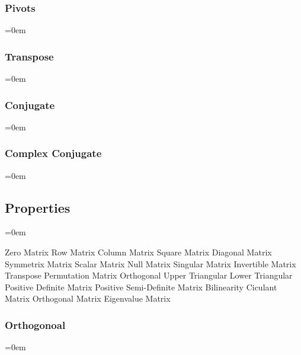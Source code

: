 \subsubsectionend
\subsubsection{Pivots}
\label{sssec:pivots}
\parindent=0em



\subsubsectionend
\subsubsection{Transpose}
\label{sssec:transpose}
\parindent=0em



\subsubsectionend
\subsubsection{Conjugate}
\label{sssec:conjugate}
\parindent=0em



\subsubsectionend
\subsubsection{Complex Conjugate}
\label{sssec:complex_conjugate}
\parindent=0em



\subsubsectionend

\subsectionend

\subsection{Properties}
\label{ssec:properties}
\parindent=0em

Zero Matrix
Row Matrix
Column Matrix
Square Matrix
Diagonal Matrix
Symmetrix Matrix
Scalar Matrix
Null Matrix
Singular Matrix
Invertible Matrix
Transpose
Permutation Matrix
Orthogonal
Upper Triangular
Lower Triangular
Positive Definite Matrix
Positive Semi-Definite Matrix
Bilinearity
Ciculant Matrix
Orthogonal Matrix
Eigenvalue Matrix

\subsubsection{Orthogonoal}
\label{sssec:orthogonoal}
\parindent=0em

